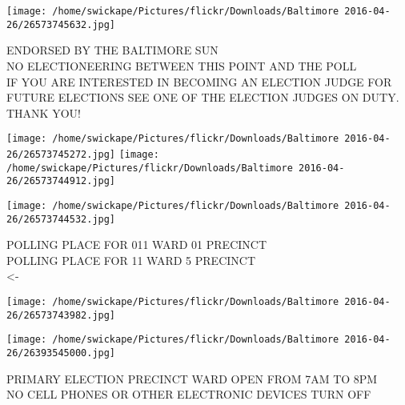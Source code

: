 \documentclass[10pt,letterpaper]{article}
\begin{document}
\vspace{0.25in}
\texttt{[image: /home/swickape/Pictures/flickr/Downloads/Baltimore 2016-04-26/26573745632.jpg]}

ENDORSED BY THE BALTIMORE SUN\\
NO ELECTIONEERING BETWEEN THIS POINT AND THE POLL\\
IF YOU ARE INTERESTED IN BECOMING AN ELECTION JUDGE FOR FUTURE ELECTIONS SEE ONE OF THE ELECTION JUDGES ON DUTY.  THANK YOU!\\
\pagebreak

\texttt{[image: /home/swickape/Pictures/flickr/Downloads/Baltimore 2016-04-26/26573745272.jpg]}
\texttt{[image: /home/swickape/Pictures/flickr/Downloads/Baltimore 2016-04-26/26573744912.jpg]}

\texttt{[image: /home/swickape/Pictures/flickr/Downloads/Baltimore 2016-04-26/26573744532.jpg]}

POLLING PLACE FOR 011 WARD 01 PRECINCT\\
POLLING PLACE FOR 11 WARD 5 PRECINCT\\
<{-}\\
\pagebreak

\texttt{[image: /home/swickape/Pictures/flickr/Downloads/Baltimore 2016-04-26/26573743982.jpg]}

\vspace{0.25in}
\texttt{[image: /home/swickape/Pictures/flickr/Downloads/Baltimore 2016-04-26/26393545000.jpg]}

PRIMARY ELECTION PRECINCT WARD OPEN FROM 7AM TO 8PM\\
NO CELL PHONES OR OTHER ELECTRONIC DEVICES TURN OFF\\
\pagebreak
\end{document}
